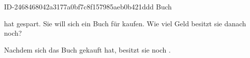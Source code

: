 \begin{exercise}
      {ID-2468468042a3177a0bf7c8f157985aeb0b421ddd}
      {Buch}
  \ifproblem\problem\par
    \xxb{} hat  gespart. Sie will sich ein Buch für  kaufen.
    Wie viel Geld besitzt sie danach noch?
  \fi
  \ifoutcome\outcome\par
    Nachdem sich \xxb{} das Buch gekauft hat, besitzt sie noch .
  \fi
\end{exercise}
